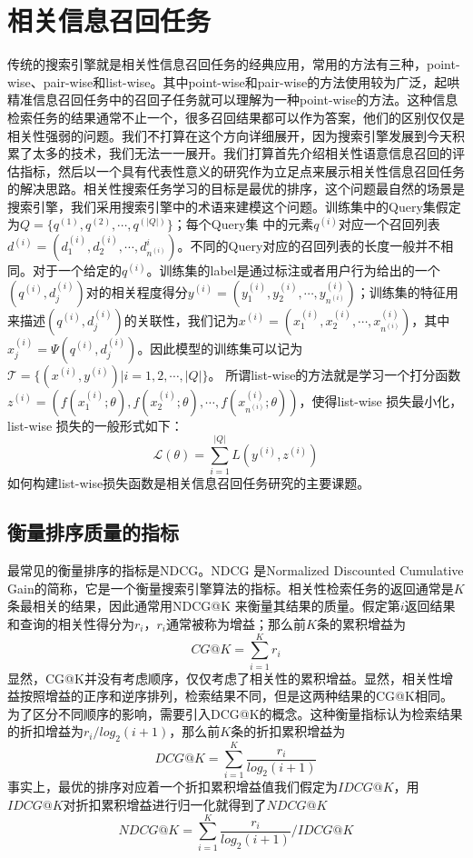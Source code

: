 \documentclass[twoside,a4paper,12pt]{book}%
\begin{document}
\section{相关信息召回任务}
传统的搜索引擎就是相关性信息召回任务的经典应用，常用的方法有三种，point-wise、pair-wise和list-wise。其中point-wise和pair-wise的方法使用较为广泛，起哄精准信息召回任务中的召回子任务就可以理解为一种point-wise的方法。这种信息检索任务的结果通常不止一个，很多召回结果都可以作为答案，他们的区别仅仅是相关性强弱的问题。我们不打算在这个方向详细展开，因为搜索引擎发展到今天积累了太多的技术，我们无法一一展开。我们打算首先介绍相关性语意信息召回的评估指标，然后以一个具有代表性意义的研究作为立足点来展示相关性信息召回任务的解决思路。相关性搜索任务学习的目标是最优的排序，这个问题最自然的场景是搜索引擎，我们采用搜索引擎中的术语来建模这个问题。训练集中的Query集假定为$Q=\{q^{(1)},q^{(2)},\cdots,q^{(|Q|)}\}$；每个Query集
中的元素$q^{(i)}$对应一个召回列表$d^{(i)}=(d_1^{(i)},d_2^{(i)},\cdots,d_{n^{(i)}}^{i})$。不同的Query对应的召回列表的长度一般并不相同。对于一个给定的$q^{(i)}$。训练集的label是通过标注或者用户行为给出的一个$(q^{(i)},d_j^{(i)})$对的相关程度得分$y^{(i)}=(y^{(i)}_1,y^{(i)}_2,\cdots,y^{(i)}_{n^{(i)}})$；训练集的特征用来描述$(q^{(i)},d_j^{(i)})$的关联性，我们记为$x^{(i)}=(x^{(i)}_1,x^{(i)}_2,\cdots,x^{(i)}_{n^{(i)}})$，其中$x^{(i)}_j=\Psi(q^{(i)},d_j^{(i)})$。因此模型的训练集可以记为$\mathcal{T}=\{(x^{(i)},y^{(i)})|i=1,2,\cdots,|Q|\}$。
所谓list-wise的方法就是学习一个打分函数$z^{(i)}=(f(x^{(i)}_1;\theta),f(x^{(i)}_2;\theta),\cdots,f(x^{(i)}_{n^{(i)}};\theta))$，使得list-wise 损失最小化，list-wise 损失的一般形式如下：
$$
\mathcal{L(\theta)}=\sum_{i=1}^{|Q|}L(y^{(i)},z^{(i)})
$$
如何构建list-wise损失函数是相关信息召回任务研究的主要课题。

\subsection{衡量排序质量的指标}
最常见的衡量排序的指标是NDCG。NDCG 是Normalized Discounted Cumulative Gain的简称，它是一个衡量搜索引擎算法的指标。相关性检索任务的返回通常是$K$条最相关的结果，因此通常用NDCG@K 来衡量其结果的质量。假定第$i$返回结果和查询的相关性得分为$r_i$，$r_i$通常被称为增益；那么前$K$条的累积增益为
$$
CG@K=\sum_{i=1}^Kr_i
$$
显然，CG@K并没有考虑顺序，仅仅考虑了相关性的累积增益。显然，相关性增益按照增益的正序和逆序排列，检索结果不同，但是这两种结果的CG@K相同。为了区分不同顺序的影响，需要引入DCG@K的概念。这种衡量指标认为检索结果的折扣增益为$r_i/log_2(i+1)$，那么前$K$条的折扣累积增益为
$$
DCG@K=\sum_{i=1}^{K}{\frac{r_i}{log_2(i+1)}}
$$
事实上，最优的排序对应着一个折扣累积增益值我们假定为$IDCG@K$，用$IDCG@K$对折扣累积增益进行归一化就得到了$NDCG@K$
$$
NDCG@K=\sum_{i=1}^{K}{\frac{r_i}{log_2(i+1)}}/IDCG@K
$$
\end{document}
